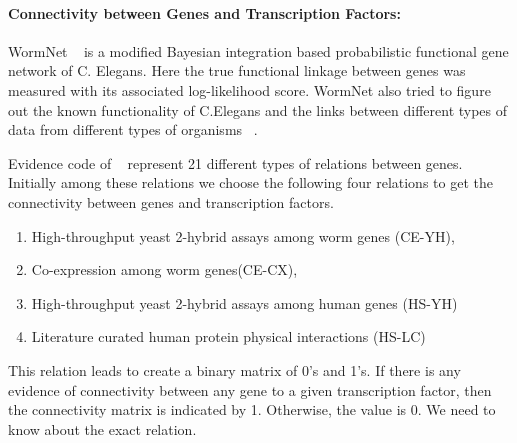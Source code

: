 \documentclass[a4paper,10pt]{report}
\begin{document}
\paragraph{Connectivity between Genes and Transcription Factors:}
WormNet ~\cite{wormnet:url} is a modified Bayesian integration based probabilistic functional gene network of C. Elegans.
Here the true functional linkage between genes was measured with its associated log-likelihood score.
WormNet also tried to figure out the known functionality of C.Elegans and the links between 
different types of data from different types of organisms ~\cite{wormnet:01, wormnet:02}.

Evidence code of ~\cite{wormnet:url} represent 21 different types of relations between genes.
Initially among these relations we choose the following four relations to get the connectivity 
between genes and transcription factors.
\begin{enumerate}
	  \item High-throughput yeast 2-hybrid assays among worm genes (CE-YH),
	  \item Co-expression among worm genes(CE-CX), 
	  \item High-throughput yeast 2-hybrid assays among human genes (HS-YH) 
	  \item Literature curated human protein physical interactions (HS-LC) 
\end{enumerate}
This relation leads to create a binary matrix of 0's and 1's. If there is any
evidence of connectivity between any gene to a given transcription factor, then the connectivity matrix
is indicated by 1. Otherwise, the value is 0. We need to know about the exact relation. 
\end{document}
